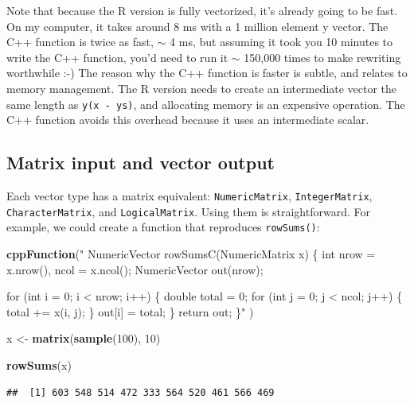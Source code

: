 \documentclass[
]{krantz}
\newenvironment{Shaded}{\begin{snugshade}}{\end{snugshade}}
\newcommand{\DecValTok}[1]{\textcolor[rgb]{0.00,0.00,0.81}{#1}}
\newcommand{\KeywordTok}[1]{\textcolor[rgb]{0.13,0.29,0.53}{\textbf{#1}}}
\newcommand{\NormalTok}[1]{#1}
\newcommand{\StringTok}[1]{\textcolor[rgb]{0.31,0.60,0.02}{#1}}
\begin{document}
Note that because the R version is fully vectorized, it's already going to be fast. On my computer, it takes around 8 ms with a 1 million element y vector. The C++ function is twice as fast, \(\sim\) 4 ms, but assuming it took you 10 minutes to write the C++ function, you'd need to run it \(\sim\) 150,000 times to make rewriting worthwhile :-) The reason why the C++ function is faster is subtle, and relates to memory management. The R version needs to create an intermediate vector the same length as \texttt{y(x\ -\ ys)}, and allocating memory is an expensive operation. The C++ function avoids this overhead because it uses an intermediate scalar.

\hypertarget{matrix-input-and-vector-output}{%
\subsection{Matrix input and vector output}\label{matrix-input-and-vector-output}}

Each vector type has a matrix equivalent: \texttt{NumericMatrix}, \texttt{IntegerMatrix}, \texttt{CharacterMatrix}, and \texttt{LogicalMatrix}. Using them is straightforward. For example, we could create a function that reproduces \texttt{rowSums()}:

\begin{Shaded}
\begin{Highlighting}[]
\KeywordTok{cppFunction}\NormalTok{(}\StringTok{"}
\StringTok{  NumericVector rowSumsC(NumericMatrix x) \{}
\StringTok{    int nrow = x.nrow(), ncol = x.ncol();}
\StringTok{    NumericVector out(nrow);}

\StringTok{    for (int i = 0; i \textless{} nrow; i++) \{}
\StringTok{      double total = 0;}
\StringTok{      for (int j = 0; j \textless{} ncol; j++) \{}
\StringTok{        total += x(i, j);}
\StringTok{      \}}
\StringTok{      out[i] = total;}
\StringTok{    \}}
\StringTok{    return out;}
\StringTok{  \}"}
\NormalTok{)}

\NormalTok{x \textless{}{-}}\StringTok{ }\KeywordTok{matrix}\NormalTok{(}\KeywordTok{sample}\NormalTok{(}\DecValTok{100}\NormalTok{), }\DecValTok{10}\NormalTok{)}

\KeywordTok{rowSums}\NormalTok{(x)}
\end{Highlighting}
\end{Shaded}

\begin{verbatim}
##  [1] 603 548 514 472 333 564 520 461 566 469
\end{verbatim}
\end{document}
